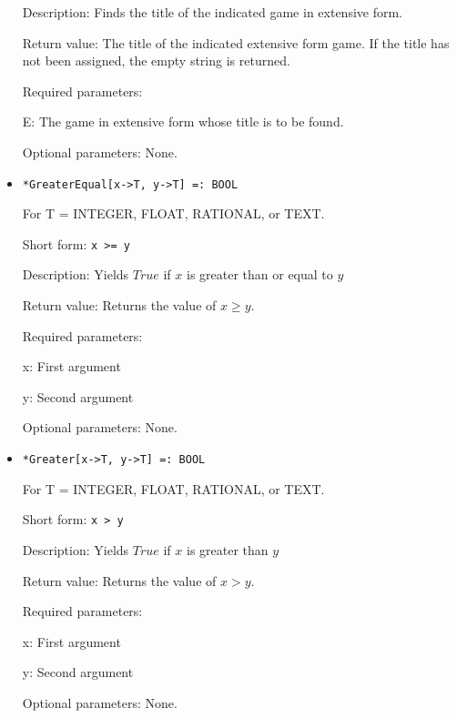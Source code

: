 \begin{itemize}
\bd
\item
[Description:] Finds the title of the indicated game in extensive
form.
\item
[Return value:] The title of the indicated extensive form game.  If
the title has not been assigned, the empty string is returned.
\item
[Required parameters:]\hfil\null

\bd
\item
[E:] The game in extensive form whose title is to be found.
\ed

\item
[Optional parameters:] None.
\ed

\item
\protect \large \begin{verbatim}
*GreaterEqual[x->T, y->T] =: BOOL
\end{verbatim}\normalsize

For T = INTEGER, FLOAT, RATIONAL, or TEXT.

\bd
\item
[Short form:] \verb+x >= y+
\item
[Description:] Yields $True$ if $x$ is greater than or equal to $y$
\item
[Return value:] Returns the value of $x \geq y$.
\item
[Required parameters:]\hfil\null

\bd
\item
[x:] First argument
\item
[y:] Second argument
\ed

\item
[Optional parameters:] None.
\ed

\item
\protect \large \begin{verbatim}
*Greater[x->T, y->T] =: BOOL
\end{verbatim}\normalsize

For T = INTEGER, FLOAT, RATIONAL, or TEXT.

\bd
\item
[Short form:] \verb+x > y+
\item
[Description:] Yields $True$ if $x$ is greater than $y$
\item
[Return value:] Returns the value of $x > y$.
\item
[Required parameters:]\hfil\null

\bd
\item
[x:] First argument
\item
[y:] Second argument
\ed
\item
[Optional parameters:] None.
\ed


\end{itemize}
